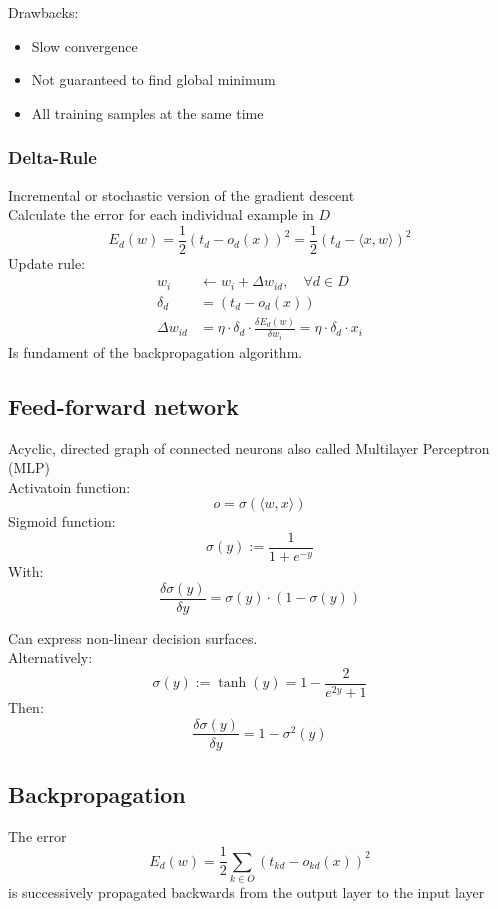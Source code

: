 Drawbacks:
\begin{itemize}
\item Slow convergence
\item Not guaranteed to find global minimum
\item All training samples at the same time
\end{itemize}

\subsubsection{Delta-Rule}%
\label{nn:ssub:delta_rule}
Incremental or stochastic version of the gradient descent\\
Calculate the error for each individual example in \(D\)\\
\[E_d (w) = \frac{1}{2}(t_d - o_d(x))^2 = \frac{1}{2}(t_d - \langle x, w\rangle)^2\]
Update rule:
\begin{align*}
  w_i &\leftarrow w_i + \Delta w_{id}, \quad \forall d \in D\\
  \delta_d &= (t_d - o_d (x))\\
  \Delta w_{id} &= \eta \cdot \delta_d \cdot \frac{\delta E_d (w)}{\delta w_i} = \eta \cdot \delta_d \cdot x_i
\end{align*}
Is fundament of the backpropagation algorithm.

\subsection{Feed-forward network}%
\label{nn:sub:feed_forward_network}
Acyclic, directed graph of connected neurons also called Multilayer Perceptron (MLP)\\
Activatoin function:
\[o = \sigma (\langle w, x\rangle)\]
Sigmoid function:
\[\sigma (y) := \frac{1}{1 + e^{-y}}\]
With:
\[\frac{\delta \sigma (y)}{\delta y} = \sigma (y) \cdot (1 - \sigma (y))\]

Can express non-linear decision surfaces.\\

Alternatively:
\[\sigma (y) := \tanh (y) = 1 - \frac{2}{e^{2y} + 1}\]
Then:
\[\frac{\delta \sigma (y)}{\delta y} = 1 - \sigma^2 (y)\]



\subsection{Backpropagation}%
\label{nn:sub:backpropagation}
The error
\[E_d (w) = \frac{1}{2}  \sum_{k \in O} (t_{kd} - o_{kd}(x))^2\]
is successively propagated backwards from the output layer to the input layer\\

